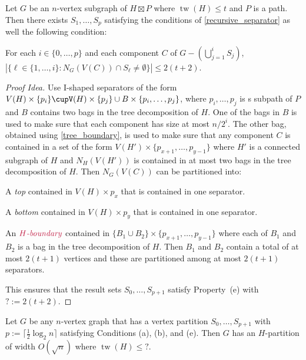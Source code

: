 \documentclass{patmorin}
\renewcommand{\le}{\leqslant}
\newcommand{\defin}[1]{\emph{\textcolor{brightmaroon}{#1}}}
\DeclareMathOperator{\tw}{tw}
\begin{document}
\begin{lem}\label{product_partition}
  Let $G$ be an $n$-vertex subgraph of $H\boxtimes P$ where $\tw(H)\le t$ and $P$ is a path.  Then there exists $S_1,\ldots,S_p$ satisfying the conditions of \cref{recursive_separator} as well the following condition:
  \begin{compactenum}[(a)]\setcounter{enumi}{4}
    \item For each $i\in\{0,\ldots,p\}$ and each component $C$ of $G-(\bigcup_{j=1}^i S_j)$, $|\{\ell\in\{1,\ldots,i\}:N_G(V(C))\cap S_\ell\neq\emptyset\}|\le {2(t+2)}$.
  \end{compactenum}
\end{lem}

\begin{proof}[Proof Idea]
  Use I-shaped separators of the form $V(H)\times\{p_i\}\cupV(H)\times\{p_j\}\cup B\times\{p_i,\ldots,p_j\}$, where $p_i,\ldots,p_j$ is s subpath of $P$ and $B$ contains two bags in the tree decomposition of $H$.  One of the bags in $B$ is used to make sure that each component has size at most $n/2^i$.  The other bag, obtained using \cref{tree_boundary}, is used to make sure that any component $C$ is contained in a set of the form $V(H')\times \{p_{x+1},\ldots,p_{y-1}\}$ where $H'$ is a connected subgraph of $H$ and $N_H(V(H'))$ is contained in at most two bags in the tree decomposition of $H$.  Then $N_G(V(C))$ can be partitioned into:
  \begin{compactenum}
    \item A \defin{top} contained in $V(H)\times p_x$ that is contained in one separator.
    \item A \defin{bottom} contained in $V(H)\times p_y$ that is contained in one separator.
    \item An $\defin{$H$-boundary}$ contained in $\{B_1\cup B_2\}\times \{p_{x+1},\ldots,p_{y-1}\}$ where each of $B_1$ and $B_2$ is a bag in the tree decomposition of $H$. Then $B_1$ and $B_2$ contain a total of at most $2(t+1)$ vertices and these are partitioned among at most $2(t+1)$ separators.
  \end{compactenum}
  This ensures that the result sets $S_0,\ldots,S_{p+1}$ satisfy Property~(e) with ${?}:=2(t+2)$.
\end{proof}



\begin{thm}
  Let $G$ be any $n$-vertex graph that has a vertex partition $S_0,\ldots,S_{p+1}$ with $p:=\lceil\tfrac{1}{2}\log_2 n\rceil$ satisfying Conditions (a), (b), and (e).  Then $G$ has an $H$-partition of width $O(\sqrt{n})$ where $\tw(H)\le {?}$.
\end{thm}
\end{document}
